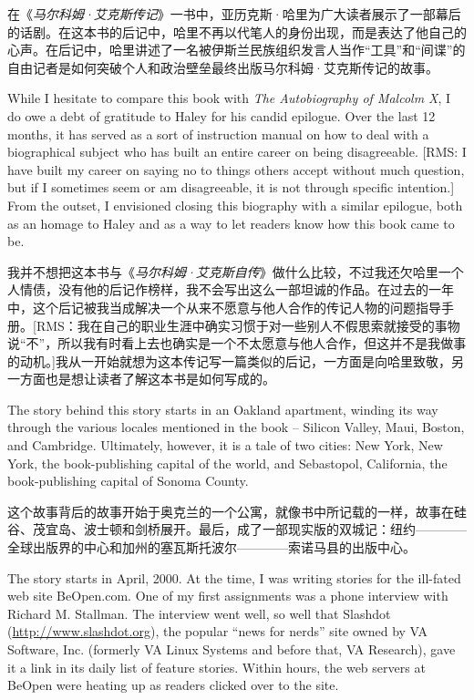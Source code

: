 \ifdefined\chs
在《\textit{马尔科姆·艾克斯传记}》一书中，亚历克斯·哈里为广大读者展示了一部幕后的话剧。在这本书的后记中，哈里不再以代笔人的身份出现，而是表达了他自己的心声。在后记中，哈里讲述了一名被伊斯兰民族组织发言人当作“工具”和“间谍”的自由记者是如何突破个人和政治壁垒最终出版马尔科姆·艾克斯传记的故事。
\fi

\ifdefined\eng
While I hesitate to compare this book with \textit{The Autobiography of Malcolm X}, I do owe a debt of gratitude to Haley for his candid epilogue. Over the last 12 months, it has served as a sort of instruction manual on how to deal with a biographical subject who has built an entire career on being disagreeable.  [RMS: I have built my career on saying no to things others accept without much question, but if I sometimes seem or am disagreeable, it is not through specific intention.]  From the outset, I envisioned closing this biography with a similar epilogue, both as an homage to Haley and as a way to let readers know how this book came to be.
\fi

\ifdefined\chs
我并不想把这本书与《\textit{马尔科姆·艾克斯自传}》做什么比较，不过我还欠哈里一个人情债，没有他的后记作榜样，我不会写出这么一部坦诚的作品。在过去的一年中，这个后记被我当成解决一个从来不愿意与他人合作的传记人物的问题指导手册。[RMS：我在自己的职业生涯中确实习惯于对一些别人不假思索就接受的事物说“不”，所以我有时看上去也确实是一个不太愿意与他人合作，但这并不是我做事的动机。]我从一开始就想为这本传记写一篇类似的后记，一方面是向哈里致敬，另一方面也是想让读者了解这本书是如何写成的。
\fi

\ifdefined\eng
The story behind this story starts in an Oakland apartment, winding its way through the various locales mentioned in the book -- Silicon Valley, Maui, Boston, and Cambridge. Ultimately, however, it is a tale of two cities: New York, New York, the book-publishing capital of the world, and Sebastopol, California, the book-publishing capital of Sonoma County.
\fi

\ifdefined\chs
这个故事背后的故事开始于奥克兰的一个公寓，就像书中所记载的一样，故事在硅谷、茂宜岛、波士顿和剑桥展开。最后，成了一部现实版的双城记：纽约————全球出版界的中心和加州的塞瓦斯托波尔————索诺马县的出版中心。
\fi

\ifdefined\eng
The story starts in April, 2000. At the time, I was writing stories for the ill-fated web site BeOpen.com. One of my first assignments was a phone interview with Richard M. Stallman. The interview went well, so well that Slashdot (\url{http://www.slashdot.org}), the popular ``news for nerds'' site owned by VA Software, Inc. (formerly VA Linux Systems and before that, VA Research), gave it a link in its daily list of feature stories. Within hours, the web servers at BeOpen were heating up as readers clicked over to the site.
\fi

